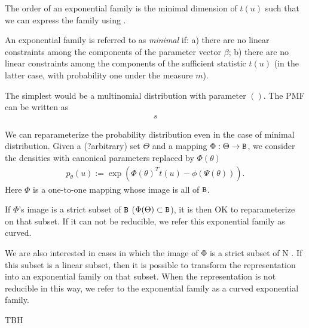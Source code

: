 \begin{define}[Order]
    The order of an exponential family is the minimal dimension of $t(u)$ such that we can express 
    the family using .
\end{define}

\begin{define}
    An exponential family is referred to as \emph{minimal} if: 
    a) there are no linear constraints among the components of the parameter vector $\beta$;
    b) there are no linear constraints among the components of the sufficient statistic $t(u)$
    (in the latter case, with probability one under the measure $m$).
\end{define}

\begin{example}
    The simplest would be a multinomial distribution with parameter $()$. 
    The PMF can be written as
    \begin{align*}
        s
    \end{align*}
\end{example}

We can reparameterize the probability distribution even in the case of minimal distribution.
Given a (?arbitrary) set $\Theta$ and a mapping $\Phi: \Theta \to \mathtt{B}$, 
we consider the densities with canonical parameters replaced by $\Phi(\theta)$
\begin{align*}
    p_\theta(u) := \exp(\Phi(\theta)^T t(u) - \phi(\Psi(\theta))).
\end{align*}
Here $\Phi$ is a one-to-one mapping whose image is all of $\mathtt{B}$.

If $\Phi$'s image is a strict subset of $\mathtt{B}$ ($\Phi(\Theta) \subset \mathtt{B}$),
it is then OK to reparameterize on that subset.
If it can not be reducible,
we refer this exponential family as curved. 


We are also interested in cases in which the image of Φ is a strict subset of N . If
this subset is a linear subset, then it is possible to transform the representation into an
exponential family on that subset. When the representation is not reducible in this way, we
refer to the exponential family as a curved exponential family.

\begin{define}
TBH
\end{define}


